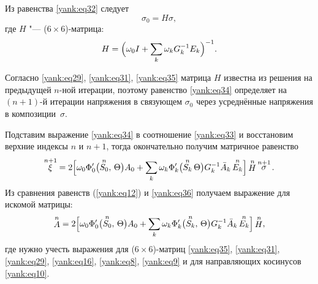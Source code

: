 Из равенства \eqref{yank:eq32} следует
\begin{equation}
\label{yank:eq34} \sigma _0 =H\sigma ,
\end{equation}
где $H$ "--- ($6{\times}6$)-матрица:
\begin{equation}
\label{yank:eq35}
H=\Bigl( \omega _0 I + \sum\limits_k \omega _k G_k^{-1} E_k \Bigr)^{-1}.
\end{equation}

Согласно \eqref{yank:eq29}, \eqref{yank:eq31}, \eqref{yank:eq35} матрица $H$ известна из решения на предыдущей $n$-ной
итерации, поэтому равенство \eqref{yank:eq34} определяет на $(n+1)$-й итерации напряжения в связующем $\sigma _0$ через усреднённые напряжения в композиции~$\sigma$.

Подставим выражение \eqref{yank:eq34} в соотношение \eqref{yank:eq33} и восстановим верхние индексы
$n$ и $n+1$, тогда окончательно получим матричное равенство
\begin{equation}
\label{yank:eq36}
\mathop \xi \limits^{n+1} =2 \Bigl[ \omega_0 \Phi'_0 \bigl(\mathop {S_0 } \limits^n,\,\Theta \bigr)A_0 + 
\sum\limits_k \omega _k \Phi'_k \bigl(\mathop {S_k } \limits^n \Theta  \bigr)G_k^{-1} \bar {A}_k
\mathop {E_k }\limits^n \Bigr] \mathop H\limits^n \mathop
\sigma \limits^{n+1}.
\end{equation}
Из сравнения равенств (\ref{yank:eq12}) и \eqref{yank:eq36} получаем выражение для искомой матрицы:
\begin{equation}
\label{yank:eq37}
\mathop A\limits^n =2 \Bigl[ \omega _0 \Phi'_0 \bigl( \mathop {S_0 }\limits^n,\,\Theta \bigr)A_0
+\sum\limits_k \omega _k \Phi'_k \bigl(\mathop {S_k } \limits^n,\,\Theta \bigr) G_k^{-1} \bar {A}_k \mathop
{E_k }\limits^n \Bigr] \mathop H\limits^n,
\end{equation}
где нужно учесть выражения для ($6{\times}6$)-матриц \eqref{yank:eq35}, \eqref{yank:eq31}, \eqref{yank:eq29}, \eqref{yank:eq16},
\eqref{yank:eq8}, \eqref{yank:eq9} и для направляющих косинусов \eqref{yank:eq10}.

